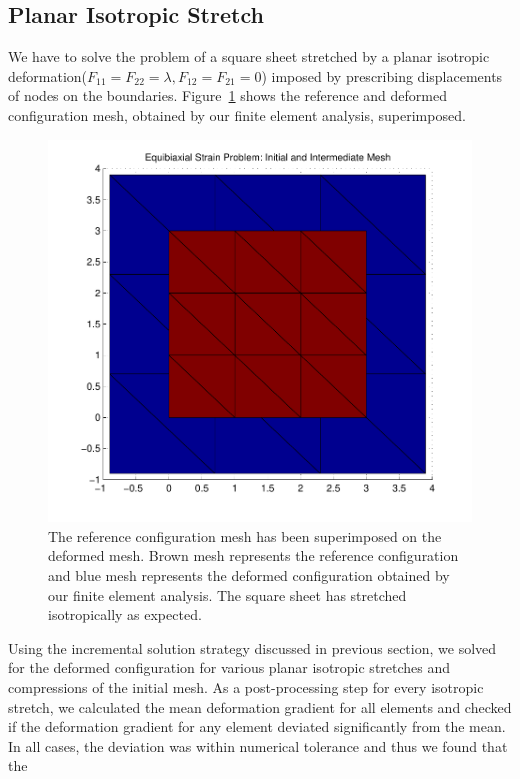 \documentclass[../main.tex]{subfiles}
\begin{document}
\subsection{Planar Isotropic Stretch}
We have to solve the problem of a square sheet stretched by a planar
isotropic deformation($F_{11}=F_{22}=\lambda,F_{12}=F_{21}=0$) imposed
by prescribing displacements of nodes on the
boundaries. Figure~\ref{fig:equiBiaxialMesh} shows the reference and
deformed configuration mesh, obtained by our finite element analysis,
superimposed.
\begin{figure}[h]
  \centering
  \includegraphics[scale=0.5]{./img/equiBiaxialMesh.pdf}
  \caption{The reference configuration mesh has been superimposed on
    the deformed mesh. Brown mesh represents the reference
    configuration and blue mesh represents the deformed configuration
    obtained by our finite element analysis. The square sheet has
    stretched isotropically as expected. }
  \label{fig:equiBiaxialMesh}
\end{figure}
Using the incremental solution strategy discussed in previous section,
we solved for the deformed configuration for various planar isotropic
stretches and compressions of the initial mesh. As a post-processing
step for every isotropic stretch, we calculated the mean deformation
gradient for all elements and checked if the deformation gradient for
any element deviated significantly from the mean. In all cases, the
deviation was within numerical tolerance and thus we found that the
\end{document}
